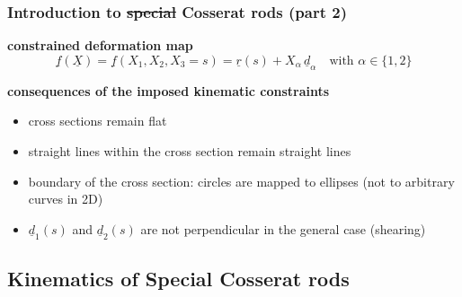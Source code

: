 \begin{frame}
  \frametitle{Introduction to \st{special} Cosserat rods (part 2)}

  \textbf{constrained deformation map}
  \begin{displaymath}
    \underline{f}(\underline{X}) = \underline{f}(X_1,X_2,X_3=s) = \underline{r}(s) + X_{\alpha} \, \underline{d}_{\alpha} \quad \text{with } \alpha \in \{1,2\}
  \end{displaymath}
  \vspace{1em}
  
  \textbf{consequences of the imposed kinematic constraints}
  \begin{itemize}
    \item cross sections remain flat
    \item straight lines within the cross section remain straight lines
    \item boundary of the cross section: circles are mapped to ellipses \newline
      \null \quad (not to arbitrary  curves in 2D)
    \item $\underline{d}_1(s)$ and $\underline{d}_2(s)$ are not perpendicular in the general case (shearing)
  \end{itemize}
\end{frame}


\subsection{Kinematics of Special Cosserat rods}


